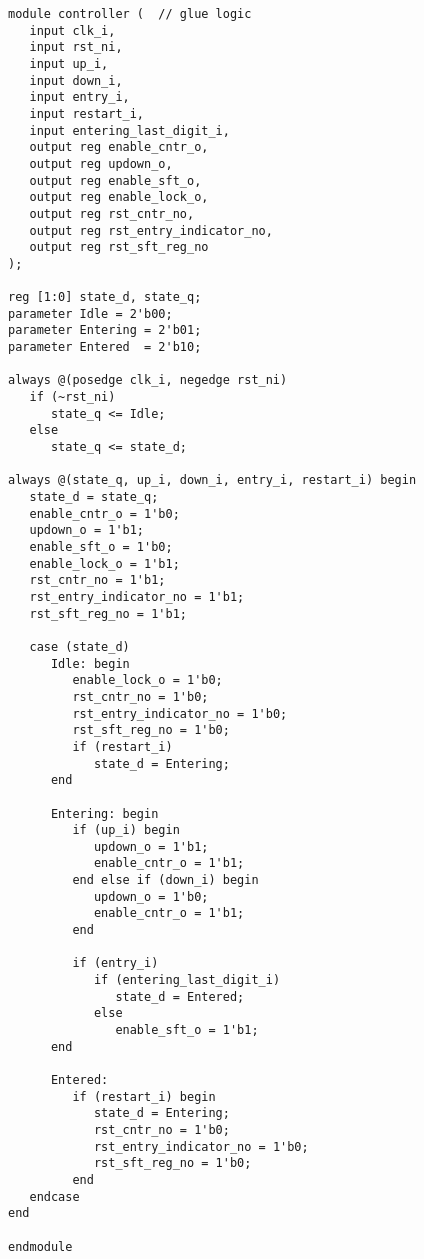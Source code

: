 \begin{verbatim}
module controller (  // glue logic
   input clk_i,
   input rst_ni,
   input up_i,
   input down_i,
   input entry_i,
   input restart_i,
   input entering_last_digit_i,
   output reg enable_cntr_o,
   output reg updown_o,
   output reg enable_sft_o,
   output reg enable_lock_o,
   output reg rst_cntr_no,
   output reg rst_entry_indicator_no,
   output reg rst_sft_reg_no
);

reg [1:0] state_d, state_q;
parameter Idle = 2'b00;
parameter Entering = 2'b01;
parameter Entered  = 2'b10;

always @(posedge clk_i, negedge rst_ni)
   if (~rst_ni)
      state_q <= Idle;
   else
      state_q <= state_d;

always @(state_q, up_i, down_i, entry_i, restart_i) begin
   state_d = state_q;
   enable_cntr_o = 1'b0;
   updown_o = 1'b1;
   enable_sft_o = 1'b0;
   enable_lock_o = 1'b1;
   rst_cntr_no = 1'b1;
   rst_entry_indicator_no = 1'b1;
   rst_sft_reg_no = 1'b1;

   case (state_d)
      Idle: begin
         enable_lock_o = 1'b0;
         rst_cntr_no = 1'b0;
         rst_entry_indicator_no = 1'b0;
         rst_sft_reg_no = 1'b0;
         if (restart_i)
            state_d = Entering;
      end

      Entering: begin
         if (up_i) begin
            updown_o = 1'b1;
            enable_cntr_o = 1'b1;
         end else if (down_i) begin
            updown_o = 1'b0;
            enable_cntr_o = 1'b1;
         end

         if (entry_i)
            if (entering_last_digit_i)
               state_d = Entered;
            else
               enable_sft_o = 1'b1;
      end

      Entered:
         if (restart_i) begin
            state_d = Entering;
            rst_cntr_no = 1'b0;
            rst_entry_indicator_no = 1'b0;
            rst_sft_reg_no = 1'b0;
         end
   endcase
end

endmodule
\end{verbatim}

